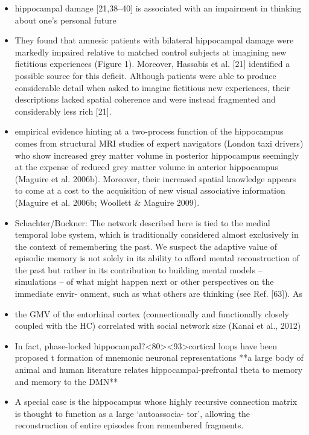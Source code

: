 \documentclass{article} %
\begin{document}
\begin{itemize}
\begin{itemize}
\item
hippocampal damage [21,38–40] is associated with an impairment in thinking about one’s personal future

\item
They found that amnesic patients with bilateral hippocampal damage were markedly impaired relative to matched control subjects at imagining new fictitious experiences (Figure 1). Moreover, Hassabis et al. [21] identified a possible source for this deficit. Although patients were able to produce considerable detail when asked to imagine fictitious new experiences, their descriptions lacked spatial coherence and were instead fragmented and considerably less rich [21].

\item
 empirical evidence hinting at a two-process function of the hippocampus comes from structural MRI studies of expert navigators (London taxi drivers) who show increased grey matter volume in posterior hippocampus seemingly at the expense of reduced grey matter volume in anterior hippocampus (Maguire et al. 2006b). Moreover, their increased spatial knowledge appears to come at a cost to the acquisition of new visual associative information (Maguire et al. 2006b; Woollett \& Maguire 2009). 

\item
Schachter/Buckner:
The network described here is tied to the medial temporal lobe system, which is traditionally considered almost exclusively in the context of remembering the past. We suspect the adaptive value of
episodic memory is not solely in its ability to afford mental reconstruction of the past but rather in its contribution to building mental models – simulations – of what might happen next or other perspectives on the immediate envir- onment, such as what others are thinking (see Ref. [63]). As

\item
the GMV of the entorhinal cortex (connectionally and functionally closely coupled with the HC) correlated with social network size (Kanai et al., 2012)


\item 
In fact, phase-locked hippocampal?<80><93>cortical loops have been proposed t
formation of mnemonic neuronal representations
**a large body of animal and human literature relates
hippocampal-prefrontal theta to memory and memory to the DMN**


\item 
A special case is the hippocampus whose highly recursive connection matrix is thought to function as a large ‘autoassocia- tor’, allowing the reconstruction of entire episodes from remembered fragments.


\end{itemize}
\end{itemize}
\end{document}
